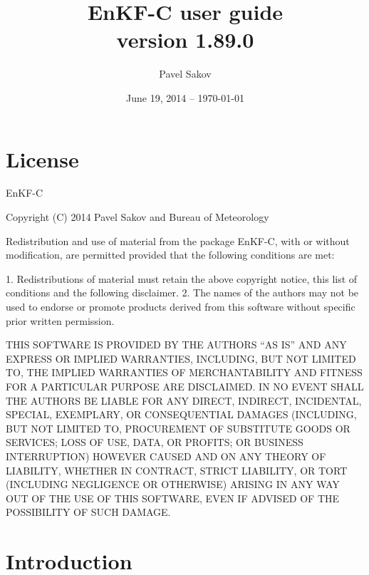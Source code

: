 \documentclass[11pt]{report}
\begin{document}
\title{EnKF-C user guide\\{\normalsize version 1.89.0}}

\author{Pavel Sakov}
\date{June 19, 2014 -- \today}

\maketitle
\thispagestyle{empty}

\clearpage

\tableofcontents

\clearpage

\chapter*{License}

EnKF-C

Copyright (C) 2014 Pavel Sakov and Bureau of Meteorology

Redistribution and use of material from the package EnKF-C, with or without
modification, are permitted provided that the following conditions are 
met:

   1. Redistributions of material must retain the above copyright notice, this
      list of conditions and the following disclaimer.
   2. The names of the authors may not be used to endorse or promote products
      derived from this software without specific prior written permission.

THIS SOFTWARE IS PROVIDED BY THE AUTHORS ``AS IS'' AND ANY EXPRESS OR IMPLIED 
WARRANTIES, INCLUDING, BUT NOT LIMITED TO, THE IMPLIED WARRANTIES OF
MERCHANTABILITY AND FITNESS FOR A PARTICULAR PURPOSE ARE DISCLAIMED. IN NO
EVENT SHALL THE AUTHORS BE LIABLE FOR ANY DIRECT, INDIRECT, INCIDENTAL, SPECIAL,
EXEMPLARY, OR CONSEQUENTIAL DAMAGES (INCLUDING, BUT NOT LIMITED TO, PROCUREMENT
OF SUBSTITUTE GOODS OR SERVICES; LOSS OF USE, DATA, OR PROFITS; OR BUSINESS
INTERRUPTION) HOWEVER CAUSED AND ON ANY THEORY OF LIABILITY, WHETHER IN
CONTRACT, STRICT LIABILITY, OR TORT (INCLUDING NEGLIGENCE OR OTHERWISE) ARISING
IN ANY WAY OUT OF THE USE OF THIS SOFTWARE, EVEN IF ADVISED OF THE POSSIBILITY
OF SUCH DAMAGE.

\chapter*{Introduction}
\end{document}
